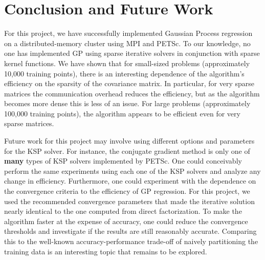\clearpage

\section{Conclusion and Future Work}
\label{sec:conclusion}

For this project, we have successfully implemented Gaussian Process regression on a
distributed-memory cluster using \ac{MPI} and \ac{PETSc}.  To our knowledge, no one has
implemented \ac{GP} using sparse iterative solvers in conjunction with sparse kernel
functions.  We have shown that for small-sized problems (approximately 10,000 training
points), there is an interesting dependence of the algorithm's efficiency on the sparsity
of the covariance matrix.  In particular, for very sparse matrices the communication
overhead reduces the efficiency, but as the algorithm becomes more dense this is less of
an issue.  For large problems (approximately 100,000 training points), the algorithm
appears to be efficient even for very sparse
matrices.  %

Future work for this project may involve using different options and parameters for the
\ac{KSP} solver.  For instance, the conjugate gradient method is only one of {\bf many}
types of \ac{KSP} solvers implemented by PETSc.  One could conceivably perform the same
experiments using each one of the \ac{KSP} solvers and analyze any change in efficiency.
Furthermore, one could experiment with the dependence on the convergence criteria to the
efficiency of \ac{GP} regression.  For this project, we used the recommended convergence
parameters that made the iterative solution nearly identical to the one computed from
direct factorization.  To make the algorithm faster at the expense of accuracy, one could
reduce the convergence thresholds and investigate if the results are still reasonably
accurate.  Comparing this to the well-known accuracy-performance trade-off of naively
partitioning the training data is an interesting topic that remains to be explored.

